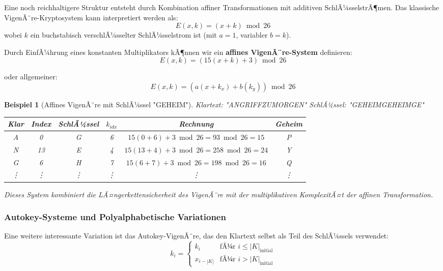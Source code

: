 ﻿\documentclass[12pt,a4paper]{article}
\newtheorem{example}{Beispiel}
\begin{document}
	Eine noch reichhaltigere Struktur entsteht durch Kombination affiner Transformationen mit additiven SchlÃ¼sselstrÃ¶men. Das klassische VigenÃ¨re-Kryptosystem kann interpretiert werden als:
	\begin{equation}
		E(x, k) = (x + k) \bmod 26
	\end{equation}
	wobei $k$ ein buchstabisch verschlÃ¼sselter SchlÃ¼sselstrom ist (mit $a = 1$, variabler $b = k$).
	
	Durch EinfÃ¼hrung eines konstanten Multiplikators kÃ¶nnen wir ein \textbf{affines VigenÃ¨re-System} definieren:
	\begin{equation}
		E(x, k) = (15(x + k) + 3) \bmod 26
	\end{equation}
	
	oder allgemeiner:
	\begin{equation}
		E(x, k) = (a(x + k_x) + b(k_y)) \bmod 26
	\end{equation}
	
	\begin{example}[Affines VigenÃ¨re mit SchlÃ¼ssel "GEHEIM"]
		Klartext: "ANGRIFFZUMORGEN"
		SchlÃ¼ssel: "GEHEIMGEHEIMGE"
		
		\begin{center}
			\small
			\begin{tabular}{|c|c|c|c|c|c|}
				\hline
				Klar & Index & SchlÃ¼ssel & $k_{idx}$ & Rechnung & Geheim \\
				\hline
				A & 0 & G & 6 & $15(0+6)+3 \bmod 26 = 93 \bmod 26 = 15$ & P \\
				N & 13 & E & 4 & $15(13+4)+3 \bmod 26 = 258 \bmod 26 = 24$ & Y \\
				G & 6 & H & 7 & $15(6+7)+3 \bmod 26 = 198 \bmod 26 = 16$ & Q \\
				\vdots & \vdots & \vdots & \vdots & \vdots & \vdots \\
				\hline
			\end{tabular}
		\end{center}
		
		Dieses System kombiniert die LÃ¤ngerkettensicherheit des VigenÃ¨re mit der multiplikativen KomplexitÃ¤t der affinen Transformation.
	\end{example}
	
	\subsubsection{Autokey-Systeme und Polyalphabetische Variationen}
	
	Eine weitere interessante Variation ist das Autokey-VigenÃ¨re, das den Klartext selbst als Teil des SchlÃ¼ssels verwendet:
	\begin{equation}
		k_i = \begin{cases}
			k_i & \text{fÃ¼r } i \leq |K|_{\text{initial}} \\
			x_{i-|K|} & \text{fÃ¼r } i > |K|_{\text{initial}}
		\end{cases}
	\end{equation}
	
\end{document}
